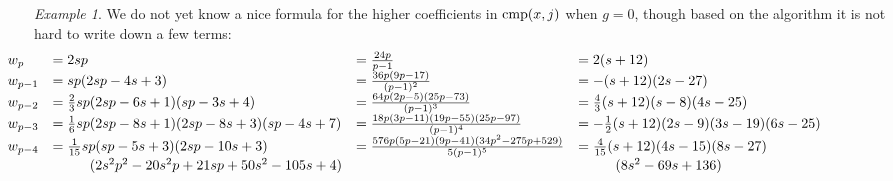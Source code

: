 \documentclass{rs}
\theoremstyle{definition}
\theoremstyle{remark}
\newtheorem{ex}[equation]{Example}
\newcommand{\cmp}{{\rm cmp}}
\renewcommand{\=}{\approx}
\renewcommand{\-}{\sim}
\numberwithin{equation}{section}
\begin{document}
\begin{ex}
 We do not yet know a nice formula for the higher coefficients in $\cmp(x,j)$ when $g = 0$, 
 though based on the algorithm it is not hard to write down a few terms: 
 \[
  \hskip -2.5cm
  \begin{array}{llll}
   w_p & = 2 s p & = \frac{24 p}{p - 1} & = 2 (s + 12) \\
   w_{p - 1} & = s p (2 s p - 4 s + 3) & = \frac{36 p (9 p - 17)}{(p - 1)^2} & = -(s + 12) (2 s - 27) \\
   w_{p - 2} & = \frac{2}{3} s p (2 s p - 6 s + 1) (s p - 3 s + 4) & = \frac{64 p (2 p - 5) (25 p - 73)}{(p - 1)^3} & = \frac{4}{3} (s + 12) (s - 8) (4 s - 25) \\
   w_{p - 3} & = \frac{1}{6} s p (2 s p - 8 s + 1) (2 s p - 8 s + 3) (s p - 4 s + 7) & = \frac{18 p (3 p - 11) (19 p - 55) (25 p - 97)}{(p - 1)^4} & = -\frac{1}{2} (s + 12) (2 s - 9) (3 s - 19) (6 s - 25) \\
   w_{p - 4} & = \frac{1}{15} s p (s p - 5 s + 3) (2 s p - 10 s + 3) & = \frac{576 p (5 p - 21) (9 p - 41) (34 p^2 - 275 p + 529)}{5 (p - 1)^5} & = \frac{4}{15} (s + 12) (4 s - 15) (8 s - 27) \\
             & ~~~~~~~~ (2 s^2 p^2 - 20 s^2 p + 21 s p + 50 s^2 - 105 s + 4) & & ~~~~~~~~ (8 s^2 - 69 s + 136) \\\\\\
  \end{array}
 \]
\end{ex}
\end{document}
